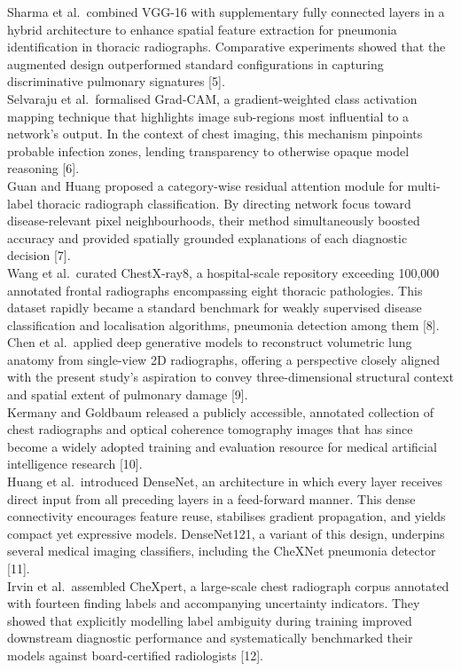 \documentclass[conference]{IEEEtran}
\begin{document}
Sharma et al.\ combined VGG-16 with supplementary fully connected layers in a hybrid architecture to enhance spatial feature extraction for pneumonia identification in thoracic radiographs. Comparative experiments showed that the augmented design outperformed standard configurations in capturing discriminative pulmonary signatures [5].\\
Selvaraju et al.\ formalised Grad-CAM, a gradient-weighted class activation mapping technique that highlights image sub-regions most influential to a network's output. In the context of chest imaging, this mechanism pinpoints probable infection zones, lending transparency to otherwise opaque model reasoning [6].\\
Guan and Huang proposed a category-wise residual attention module for multi-label thoracic radiograph classification. By directing network focus toward disease-relevant pixel neighbourhoods, their method simultaneously boosted accuracy and provided spatially grounded explanations of each diagnostic decision [7].\\
Wang et al.\ curated ChestX-ray8, a hospital-scale repository exceeding 100,000 annotated frontal radiographs encompassing eight thoracic pathologies. This dataset rapidly became a standard benchmark for weakly supervised disease classification and localisation algorithms, pneumonia detection among them [8].\\
Chen et al.\ applied deep generative models to reconstruct volumetric lung anatomy from single-view 2D radiographs, offering a perspective closely aligned with the present study's aspiration to convey three-dimensional structural context and spatial extent of pulmonary damage [9].\\
Kermany and Goldbaum released a publicly accessible, annotated collection of chest radiographs and optical coherence tomography images that has since become a widely adopted training and evaluation resource for medical artificial intelligence research [10].\\
Huang et al.\ introduced DenseNet, an architecture in which every layer receives direct input from all preceding layers in a feed-forward manner. This dense connectivity encourages feature reuse, stabilises gradient propagation, and yields compact yet expressive models. DenseNet121, a variant of this design, underpins several medical imaging classifiers, including the CheXNet pneumonia detector [11].\\
Irvin et al.\ assembled CheXpert, a large-scale chest radiograph corpus annotated with fourteen finding labels and accompanying uncertainty indicators. They showed that explicitly modelling label ambiguity during training improved downstream diagnostic performance and systematically benchmarked their models against board-certified radiologists [12].\\
\end{document}
